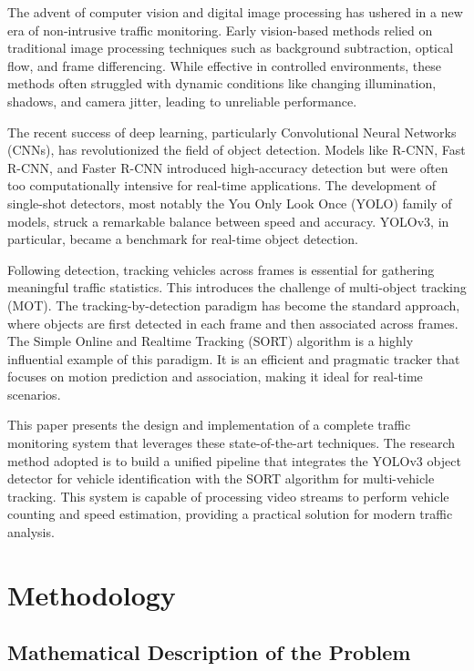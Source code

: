 \documentclass{article}
\begin{document}
The advent of computer vision and digital image processing has ushered in a new era of non-intrusive traffic monitoring. Early vision-based methods relied on traditional image processing techniques such as background subtraction, optical flow, and frame differencing. While effective in controlled environments, these methods often struggled with dynamic conditions like changing illumination, shadows, and camera jitter, leading to unreliable performance.

The recent success of deep learning, particularly Convolutional Neural Networks (CNNs), has revolutionized the field of object detection. Models like R-CNN, Fast R-CNN, and Faster R-CNN introduced high-accuracy detection but were often too computationally intensive for real-time applications. The development of single-shot detectors, most notably the You Only Look Once (YOLO) family of models, struck a remarkable balance between speed and accuracy. YOLOv3, in particular, became a benchmark for real-time object detection.

Following detection, tracking vehicles across frames is essential for gathering meaningful traffic statistics. This introduces the challenge of multi-object tracking (MOT). The tracking-by-detection paradigm has become the standard approach, where objects are first detected in each frame and then associated across frames. The Simple Online and Realtime Tracking (SORT) algorithm is a highly influential example of this paradigm. It is an efficient and pragmatic tracker that focuses on motion prediction and association, making it ideal for real-time scenarios.

This paper presents the design and implementation of a complete traffic monitoring system that leverages these state-of-the-art techniques. The research method adopted is to build a unified pipeline that integrates the YOLOv3 object detector for vehicle identification with the SORT algorithm for multi-vehicle tracking. This system is capable of processing video streams to perform vehicle counting and speed estimation, providing a practical solution for modern traffic analysis.

\section{Methodology}

\subsection{Mathematical Description of the Problem}
\end{document}
